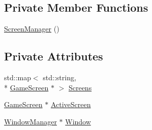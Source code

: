 \subsection*{Private Member Functions}
\begin{DoxyCompactItemize}
\item 
\hyperlink{class_screen_manager_ab397f82b180ee7d50cc1e305c19ed733}{Screen\-Manager} ()
\end{DoxyCompactItemize}
\subsection*{Private Attributes}
\begin{DoxyCompactItemize}
\item 
std\-::map$<$ std\-::string, \\*
\hyperlink{class_game_screen}{Game\-Screen} $\ast$ $>$ \hyperlink{class_screen_manager_a54eb2c9667efda525a35d0d7043e8807}{Screens}
\item 
\hyperlink{class_game_screen}{Game\-Screen} $\ast$ \hyperlink{class_screen_manager_abb46941be1b908a2b9d8053409e89597}{Active\-Screen}
\item 
\hyperlink{class_window_manager}{Window\-Manager} $\ast$ \hyperlink{class_screen_manager_a5fee528eafa1b2defad2a7c4bd6766aa}{Window}
\end{DoxyCompactItemize}


